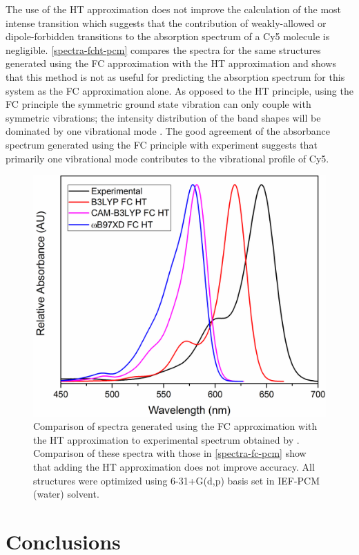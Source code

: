 The use of the HT approximation does not improve the calculation of the most intense transition which suggests that the contribution of weakly-allowed or dipole-forbidden transitions to the absorption spectrum of a Cy5 molecule is negligible. \autoref{spectra-fcht-pcm} compares the spectra for the same structures generated using the FC approximation with the HT approximation and shows that this method is not as useful for predicting the absorption spectrum for this system as the FC approximation alone. As opposed to the HT principle, using the FC principle the symmetric ground state vibration can only couple with symmetric vibrations; the intensity distribution of the band shapes will be dominated by one vibrational mode \cite{Mustroph2018}. The good agreement of the absorbance spectrum generated using the FC principle with experiment suggests that primarily one vibrational mode contributes to the vibrational profile of Cy5. 
\begin{figure}[h!]
    \centering
    \includegraphics[width=0.8\linewidth]{figures/pub1/FCHT-PCM.pdf}
    \caption{Comparison of spectra generated using the FC approximation with the HT approximation to experimental spectrum obtained by \cite{Cannon2017}. Comparison of these spectra with those in \autoref{spectra-fc-pcm} show that adding the HT approximation does not improve accuracy. All structures were optimized using 6-31+G(d,p) basis set in IEF-PCM (water) solvent.}\label{spectra-fcht-pcm}
\end{figure}

\section{Conclusions}

